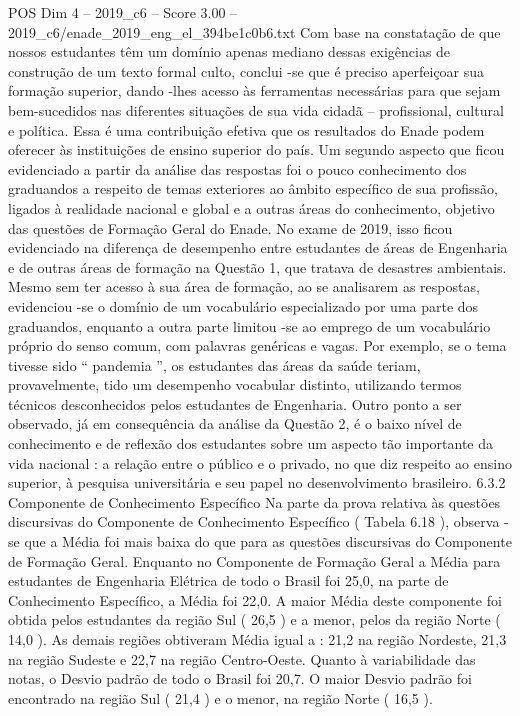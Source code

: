 \begin{textsample}{POS Dim 4 – 2019\_c6 – Score 3.00 – 2019\_c6/enade\_2019\_eng\_el\_394be1c0b6.txt}
Com base na constatação de que nossos estudantes têm um domínio apenas mediano dessas exigências de construção de um texto formal culto, conclui -se que é preciso aperfeiçoar sua formação superior, dando -lhes acesso às ferramentas necessárias para que sejam bem-sucedidos nas diferentes situações de sua vida cidadã – profissional, cultural e política.
Essa é uma contribuição efetiva que os resultados do Enade podem oferecer às instituições de ensino superior do país.
Um segundo aspecto que ficou evidenciado a partir da análise das respostas foi o pouco conhecimento dos graduandos a respeito de temas exteriores ao âmbito específico de sua profissão, ligados à realidade nacional e global e a outras áreas do conhecimento, objetivo das questões de Formação Geral do Enade.
No exame de 2019, isso ficou evidenciado na diferença de desempenho entre estudantes de áreas de Engenharia e de outras áreas de formação na Questão 1, que tratava de desastres ambientais.
Mesmo sem ter acesso à sua área de formação, ao se analisarem as respostas, evidenciou -se o domínio de um vocabulário especializado por uma parte dos graduandos, enquanto a outra parte limitou -se ao emprego de um vocabulário próprio do senso comum, com palavras genéricas e vagas.
Por exemplo, se o tema tivesse sido “ pandemia ”, os estudantes das áreas da saúde teriam, provavelmente, tido um desempenho vocabular distinto, utilizando termos técnicos desconhecidos pelos estudantes de Engenharia.
Outro ponto a ser observado, já em consequência da análise da Questão 2, é o baixo nível de conhecimento e de reflexão dos estudantes sobre um aspecto tão importante da vida nacional : a relação entre o público e o privado, no que diz respeito ao ensino superior, à pesquisa universitária e seu papel no desenvolvimento brasileiro. 6.3.2 Componente de Conhecimento Específico Na parte da prova relativa às questões discursivas do Componente de Conhecimento Específico ( Tabela 6.18 ), observa -se que a Média foi mais baixa do que para as questões discursivas do Componente de Formação Geral.
Enquanto no Componente de Formação Geral a Média para estudantes de Engenharia Elétrica de todo o Brasil foi 25,0, na parte de Conhecimento Específico, a Média foi 22,0.
A maior Média deste componente foi obtida pelos estudantes da região Sul ( 26,5 ) e a menor, pelos da região Norte ( 14,0 ).
As demais regiões obtiveram Média igual a : 21,2 na região Nordeste, 21,3 na região Sudeste e 22,7 na região Centro-Oeste.
Quanto à variabilidade das notas, o Desvio padrão de todo o Brasil foi 20,7.
O maior Desvio padrão foi encontrado na região Sul ( 21,4 ) e o menor, na região Norte ( 16,5 ).

\end{textsample}

